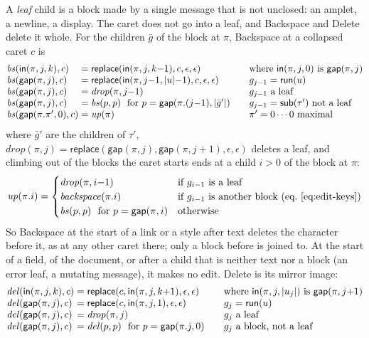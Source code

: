 \documentclass[11pt]{article}
\numberwithin{equation}{section}
\newcommand{\kw}[1]{\ensuremath{\mathsf{#1}}}
\begin{document}
A \emph{leaf} child is a block made by a single message that is not
unclosed: an amplet, a newline, a display.  The caret does not go into a
leaf, and Backspace and Delete delete it whole.  For the children $\bar g$
of the block at $\pi$, Backspace at a collapsed caret $c$ is
\begin{equation}\label{eq:view-backspace}
\begin{array}{@{}l@{\;=\;}l@{\qquad}l@{}}
\mathit{bs}(\kw{in}(\pi, j, k), c) & \kw{replace}(\kw{in}(\pi, j, k{-}1), c, \epsilon, \epsilon)
  & \text{where } \kw{in}(\pi, j, 0) \text{ is } \kw{gap}(\pi, j) \\
\mathit{bs}(\kw{gap}(\pi, j), c) & \kw{replace}(\kw{in}(\pi, j{-}1, |u|{-}1), c, \epsilon, \epsilon)
  & g_{j-1} = \kw{run}(u) \\
\mathit{bs}(\kw{gap}(\pi, j), c) & \mathit{drop}(\pi, j{-}1) & g_{j-1} \text{ a leaf} \\
\mathit{bs}(\kw{gap}(\pi, j), c) & \mathit{bs}(p, p)\ \text{ for } p = \kw{gap}(\pi.(j{-}1), |\bar g'|)
  & g_{j-1} = \kw{sub}(\tau') \text{ not a leaf} \\
\mathit{bs}(\kw{gap}(\pi.\pi', 0), c) & \mathit{up}(\pi) & \pi' = 0\cdots0 \text{ maximal}
\end{array}
\end{equation}
where $\bar g'$ are the children of $\tau'$, $\mathit{drop}(\pi, j) =
\kw{replace}(\kw{gap}(\pi, j), \kw{gap}(\pi, j{+}1), \epsilon, \epsilon)$
deletes a leaf, and climbing out of the blocks the caret starts ends at a
child $i > 0$ of the block at $\pi$:
\[
\mathit{up}(\pi.i) =
\begin{cases}
\mathit{drop}(\pi, i{-}1) & \text{if } g_{i-1} \text{ is a leaf} \\
\mathit{backspace}(\pi.i) & \text{if } g_{i-1} \text{ is another block (eq.~\ref{eq:edit-keys})} \\
\mathit{bs}(p, p)\ \text{ for } p = \kw{gap}(\pi, i) & \text{otherwise}
\end{cases}
\]
So Backspace at the start of a link or a style after text deletes the
character before it, as at any other caret there; only a block before is
joined to.  At the start of a field, of the document, or after a child
that is neither text nor a block (an error leaf, a mutating message), it
makes no edit.  Delete is its mirror image:
\begin{equation}\label{eq:view-delete}
\begin{array}{@{}l@{\;=\;}l@{\qquad}l@{}}
\mathit{del}(\kw{in}(\pi, j, k), c) & \kw{replace}(c, \kw{in}(\pi, j, k{+}1), \epsilon, \epsilon)
  & \text{where } \kw{in}(\pi, j, |u_j|) \text{ is } \kw{gap}(\pi, j{+}1) \\
\mathit{del}(\kw{gap}(\pi, j), c) & \kw{replace}(c, \kw{in}(\pi, j, 1), \epsilon, \epsilon)
  & g_j = \kw{run}(u) \\
\mathit{del}(\kw{gap}(\pi, j), c) & \mathit{drop}(\pi, j) & g_j \text{ a leaf} \\
\mathit{del}(\kw{gap}(\pi, j), c) & \mathit{del}(p, p)\ \text{ for } p = \kw{gap}(\pi.j, 0)
  & g_j \text{ a block, not a leaf}
\end{array}
\end{equation}
\end{document}
